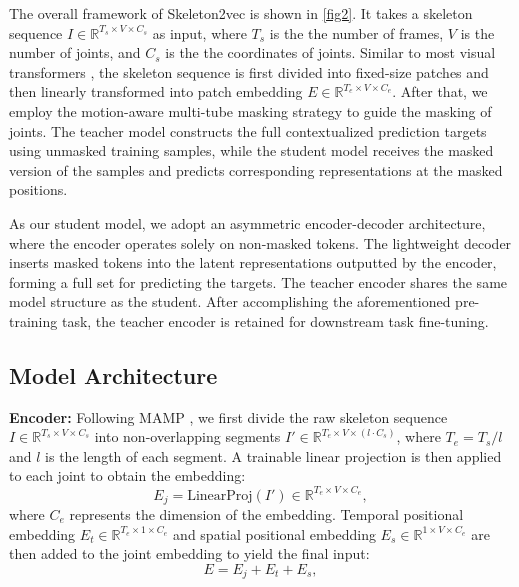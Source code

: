 The overall framework of Skeleton2vec is shown in \cref{fig2}.
It takes a skeleton sequence $I \in \mathbb{R}^{T_{s} \times V \times C_{s}}$ as
input, where $T_{s}$ is the the number of frames,
$V$ is the number of joints, and $C_{s}$ is the
the coordinates of joints.
Similar to most visual transformers \cite{dosovitskiy2020image},
the skeleton sequence is first divided into fixed-size patches and then linearly
transformed into patch embedding $E \in \mathbb{R}^{T_{e} \times V \times C_{e}}$.
After that, we employ the motion-aware multi-tube masking strategy to guide the masking of
joints. The teacher model constructs the full contextualized prediction targets
using unmasked training samples, while the student model receives the masked version
of the samples and predicts corresponding representations at the masked positions.

As our student model, we adopt an asymmetric encoder-decoder architecture, where the
encoder operates solely on non-masked tokens. The lightweight decoder inserts masked
tokens into the latent representations outputted by the encoder, forming a full set
for predicting the targets.
The teacher encoder shares the same model structure as the student. After accomplishing
the aforementioned pre-training task, the teacher encoder is retained for downstream task fine-tuning.

\subsection{Model Architecture}
\noindent \textbf{Encoder:}
Following MAMP \cite{mao2023masked}, we first divide the raw skeleton sequence
$I \in \mathbb{R}^{T_{s} \times V \times C_{s}}$ into non-overlapping segments
$I' \in \mathbb{R}^{T_{e} \times V \times (l \cdot C_{s})}$, where $T_{e}=T_{s}/l$
and $l$ is the length of each segment.
A trainable linear projection is then applied to each joint to obtain the embedding:
\begin{equation}
    \label{eq:joint_embedding_1}
    E_{j} = \text{LinearProj}(I') \in \mathbb{R}^{T_{e} \times V \times C_{e}},
\end{equation}
where $C_{e}$ represents the dimension of the embedding.
Temporal positional embedding $E_{t} \in \mathbb{R}^{T_{e} \times 1 \times C_{e}}$
and spatial positional embedding $E_{s} \in \mathbb{R}^{1 \times V \times C_{e}}$
are then added to the joint embedding to yield the final input:
\begin{equation}
    \label{eq:joint_embedding_2}
    E = E_{j} + E_{t} + E_{s},
\end{equation}


